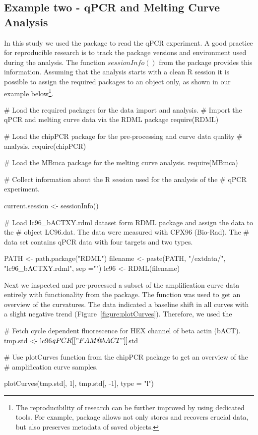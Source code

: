 \subsection{Example two - qPCR and Melting Curve Analysis}
In this study we used the  package to read the qPCR experiment. A 
good practice for reproducible research is to track the package versions and 
environment used during the analysis. The function $sessionInfo()$ from the 
 package provides this information. Assuming that the analysis 
starts with a clean R session it is possible to assign the required packages to 
an object only, as shown in our example below\footnote{The reproducibility of 
research can be further improved by using dedicated tools. For example, 
 package allows not only stores and recovers crucial data, 
but also preserves metadata of saved objects.}.

\begin{example}
# Load the required packages for the data import and analysis.
# Import the qPCR and melting curve data via the RDML package
require(RDML)

# Load the chipPCR package for the pre-processing and curve data quality
# analysis.
require(chipPCR)

# Load the MBmca package for the melting curve analysis.
require(MBmca)

# Collect information about the R session used for the analysis of the
# qPCR experiment.

current.session <- sessionInfo()

# Load lc96_bACTXY.rdml dataset form RDML package and assign the data to the 
# object LC96.dat. The data were measured with CFX96 (Bio-Rad). The 
# data set contains qPCR data with four targets and two types.

PATH <- path.package("RDML")
filename <- paste(PATH, "/extdata/", "lc96_bACTXY.rdml", sep ="")
lc96 <- RDML(filename)
\end{example}

Next we inspected and pre-processed a subset of the amplification curve data 
entirely with functionality from the  package. The 
 function was used to get an overview of the curvatures. The 
data indicated a baseline shift in all curves with a slight negative trend 
(Figure~\ref{figure:plotCurves}). Therefore, we used the 

\begin{example}
# Fetch cycle dependent fluorescence for HEX channel of beta actin (bACT).
tmp.std <- lc96$qPCR[["FAM@bACT"]]$std


# Use plotCurves function from the chipPCR package to get an overview of the 
# amplification curve samples.

plotCurves(tmp.std[, 1], tmp.std[, -1], type = "l")

\end{example}


